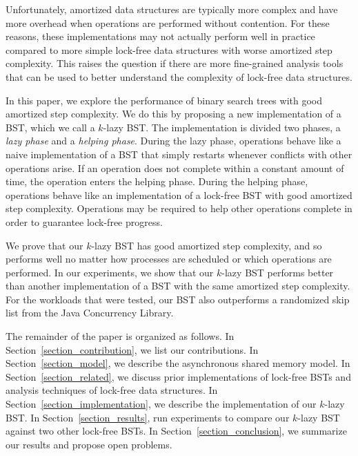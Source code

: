 \documentclass[letterpaper,twocolumn]{article}
\begin{document}
Unfortunately, amortized data structures are typically more complex and have more overhead when operations are performed without contention. For these reasons, these implementations may not actually perform well in practice compared to more simple lock-free data structures with worse amortized step complexity. This raises the question if there are more fine-grained analysis tools that can be used to better understand the complexity of lock-free data structures.

In this paper, we explore the performance of binary search trees with good amortized step complexity. We do this by proposing a new implementation of a BST, which we call a $k$-lazy BST. The implementation is divided two phases, a \textit{lazy phase} and a \textit{helping phase}. During the lazy phase, operations behave like a naive implementation of a BST that simply restarts whenever conflicts with other operations arise. If an operation does not complete within a constant amount of time, the operation enters the helping phase. During the helping phase, operations behave like an implementation of a lock-free BST with good amortized step complexity. Operations may be required to help other operations complete in order to guarantee lock-free progress. 

We prove that our $k$-lazy BST has good amortized step complexity, and so performs well no matter how processes are scheduled or which operations are performed. In our experiments, we show that our $k$-lazy BST performs better than another implementation of a BST with the same amortized step complexity. For the workloads that were tested, our BST also outperforms a randomized skip list from the Java Concurrency Library.

The remainder of the paper is organized as follows. In Section~\ref{section_contribution}, we list our contributions. In Section~\ref{section_model}, we describe the asynchronous shared memory model. In Section~\ref{section_related}, we discuss prior implementations of lock-free BSTs and analysis techniques of lock-free data structures. In Section~\ref{section_implementation}, we describe the implementation of our $k$-lazy BST. In Section~\ref{section_results}, run experiments to compare our $k$-lazy BST against two other lock-free BSTs. In Section~\ref{section_conclusion}, we summarize our results and propose open problems.
\end{document}
